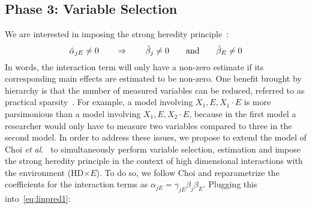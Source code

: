 \subsection{Phase 3: Variable Selection} \label{sec:varselect}
We are interested in imposing the strong heredity principle~\citep{chipman1996bayesian}: 
\begin{equation}
\hat{\alpha}_{jE} \neq 0 \qquad \Rightarrow \qquad \hat{\beta}_j \neq 0 \qquad \textrm{{and}} \qquad \hat{\beta}_E \neq 0   \label{eq:heredity}
\end{equation}
In words, the interaction term will only have a non-zero estimate if its corresponding main effects are estimated to be non-zero. One benefit brought by hierarchy is that the number of measured variables can be reduced, referred to as practical sparsity~\cite{she2014group,bien2013lasso}. For example, a model involving $X_1, E, X_1 \cdot E$ is more parsimonious than a model involving $X_1, E, X_2 \cdot E$, because in the first model a researcher would only have to measure two variables compared to three in the second model. In order to address these issues, we propose to extend the model of Choi \textit{et al.}~\citep{choi2010variable} to simultaneously perform variable selection, estimation and impose the strong heredity principle in the context of high dimensional interactions with the environment (HD$\times E$). To do so, we follow Choi and reparametrize the coefficients for the interaction terms as $\alpha_{jE} = \gamma_{jE} \beta_j \beta_E$. Plugging this into~\eqref{eq:linpred1}:
